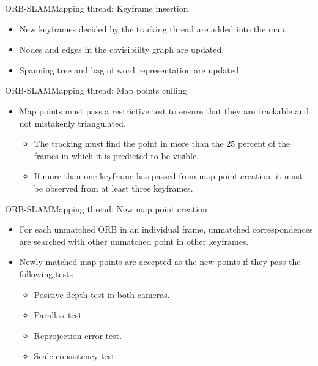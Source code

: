 \documentclass[aspectratio=169]{beamer}
\begin{document}
\begin{frame}{ORB-SLAM}{Mapping thread: Keyframe insertion}
  \begin{itemize}
      \item{
      New keyframes decided by the tracking thread are added into the map.
      }
      \item{
      Nodes and edges in the covisibiilty graph are updated.
      }
      \item{
      Spanning tree and bag of word representation are updated.
      }
  \end{itemize}
\end{frame}

\begin{frame}{ORB-SLAM}{Mapping thread: Map points culling}
  \begin{itemize}
      \item{
      Map points must pass a restrictive test to ensure that they are trackable and not mistakenly triangulated.
      \begin{itemize}
          \item{
          The tracking must find the point in more than the 25 percent of the frames in which it is predicted to be visible.
          }
          \item{
          If more than one keyframe has passed from map point creation, it must be observed from at least three keyframes.
          }
      \end{itemize}
      }
  \end{itemize}
\end{frame}

\begin{frame}{ORB-SLAM}{Mapping thread: New map point creation}
    \begin{itemize}
        \item{
        For each unmatched ORB in an individual frame, unmatched correspondences are searched with other unmatched point in other keyframes.
        }
        \item{
        Newly matched map points are accepted as the new points if they pass the following tests
        \begin{itemize}
            \item{
            Positive depth test in both cameras.
            }
            \item{
            Parallax test.
            }
            \item{
            Reprojection error test.
            }
            \item{
            Scale consistency test.
            }
        \end{itemize}
        }
    \end{itemize}
\end{frame}
\end{document}
